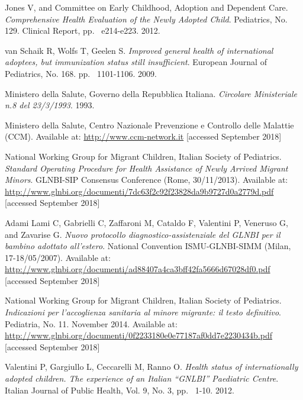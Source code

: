 \begin{thebibliography}{50}
  Jones V, and Committee on Early Childhood, Adoption and Dependent Care.
  \textit{Comprehensive Health Evaluation of the Newly Adopted Child}.
  Pediatrics, No. 129.
  Clinical Report,
  pp. ~e214-e223.
  2012.
  
  van Schaik R, Wolfs T, Geelen S.
  \textit{Improved general health of international adoptees, but immunization status still insufficient}.
  European Journal of Pediatrics, No. 168.
  pp. ~1101-1106.
  2009.
  
  Ministero della Salute, Governo della Repubblica Italiana.
  \textit{Circolare Ministeriale n.8 del 23/3/1993}.
  1993.

  Ministero della Salute, Centro Nazionale Prevenzione e Controllo delle Malattie (CCM).  
  Available at: \url{http://www.ccm-network.it} [accessed September 2018]
  
  National Working Group for Migrant Children, Italian Society of Pediatrics.
  \textit{Standard Operating Procedure for Health Assistance of Newly Arrived Migrant Minors}.
  GLNBI-SIP Consensus Conference (Rome, 30/11/2013).
  Available at: \url{http://www.glnbi.org/documenti/7dc63f2c92f23828da9b9727d0a2779d.pdf} [accessed September 2018]
  
  Adami Lami C, Gabrielli C, Zaffaroni M, Cataldo F, Valentini P, Veneruso G, and Zavarise G.
  \textit{Nuovo protocollo diagnostico-assistenziale del GLNBI per il bambino adottato all'estero}.
   National Convention ISMU-GLNBI-SIMM (Milan, 17-18/05/2007).
  Available at: \url{http://www.glnbi.org/documenti/ad88407a4ca3bff42fa5666d67028df0.pdf} [accessed September 2018]
  
  National Working Group for Migrant Children, Italian Society of Pediatrics.
  \textit{Indicazioni per l’accoglienza sanitaria al minore migrante: il testo definitivo}.
  Pediatria, No. 11.
  November 2014.
  Available at: \url{http://www.glnbi.org/documenti/0f2233180e0e77187af0dd7e2230434b.pdf} [accessed September 2018]
  
  Valentini P, Gargiullo L, Ceccarelli M, Ranno O.
  \textit{Health status of internationally adopted children. The experience of an Italian “GNLBI” Paediatric Centre}.
  Italian Journal of Public Health, Vol. 9, No. 3,
  pp. ~1-10.
  2012.
  

\end{thebibliography}
